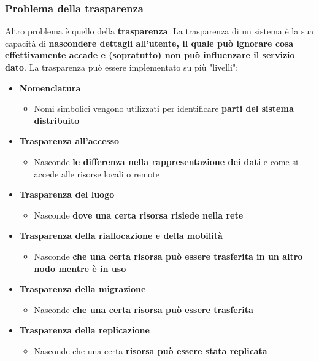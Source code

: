 \documentclass[12pt]{article}
\begin{document}
\subsubsection{Problema della trasparenza}
Altro problema è quello della \textbf{trasparenza}. La trasparenza di un sistema è la sua capacità di \textbf{nascondere dettagli all'utente, il quale può ignorare cosa effettivamente accade e (sopratutto) non può influenzare il servizio dato}. \newline
La trasparenza può essere implementato su più "livelli":
\begin{itemize}
    \item \textbf{Nomenclatura}
          \begin{itemize}
              \item Nomi simbolici vengono utilizzati per identificare \textbf{parti del sistema distribuito}
          \end{itemize}
    \item \textbf{Trasparenza all'accesso}
          \begin{itemize}
              \item Nasconde \textbf{le differenza nella rappresentazione dei dati} e come si accede alle risorse locali o remote
          \end{itemize}
    \item \textbf{Trasparenza del luogo}
          \begin{itemize}
              \item Nasconde \textbf{dove una certa risorsa risiede nella rete}
          \end{itemize}
    \item \textbf{Trasparenza della riallocazione e della mobilità}
          \begin{itemize}
              \item Nasconde \textbf{che una certa risorsa può essere trasferita in un altro nodo mentre è in uso}
          \end{itemize}
    \item \textbf{Trasparenza della migrazione}
          \begin{itemize}
              \item Nasconde \textbf{che una certa risorsa può essere trasferita}
          \end{itemize}
          \newpage
    \item \textbf{Trasparenza della replicazione}
          \begin{itemize}
              \item Nasconde che una certa \textbf{risorsa può essere stata replicata}

\end{itemize}
\end{itemize}
\end{document}
